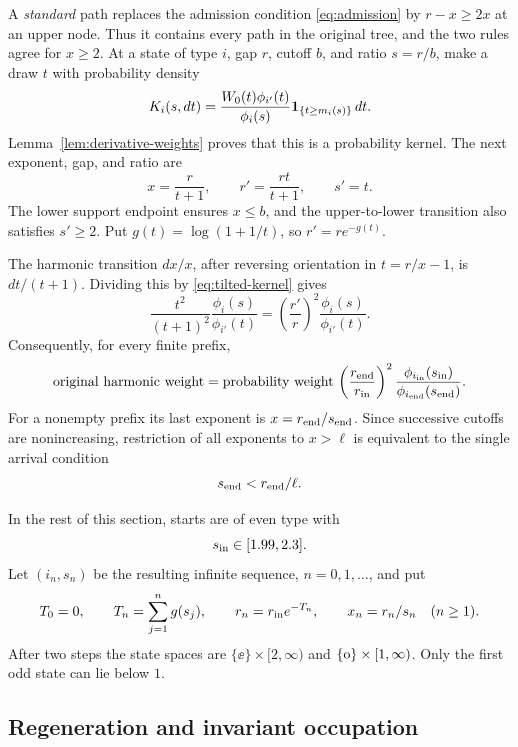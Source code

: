 A \emph{standard} path replaces the admission condition
\eqref{eq:admission} by \(r-x\ge2x\) at an upper node.
Thus it contains every path in the original tree, and the two rules
agree for \(x\ge2\).
At a state of type \(i\), gap \(r\), cutoff \(b\), and ratio \(s=r/b\),
make a draw \(t\) with probability density
\begin{equation}\label{eq:tilted-kernel}
 K_i(s,dt)=
 \frac{W_0(t)\phi_{i'}(t)}{\phi_i(s)}
 \mathbf 1_{\{t\ge m_i(s)\}}\,dt.
\end{equation}
Lemma~\ref{lem:derivative-weights} proves that this is a probability
kernel.  The next exponent, gap, and ratio are
\[
 x=\frac r{t+1},\qquad r'=\frac{rt}{t+1},\qquad s'=t.
\]
The lower support endpoint ensures \(x\le b\), and the upper-to-lower
transition also satisfies \(s'\ge2\).
Put \(g(t)=\log(1+1/t)\), so \(r'=r e^{-g(t)}\).

The harmonic transition \(dx/x\), after reversing orientation in
\(t=r/x-1\), is \(dt/(t+1)\).  Dividing this by
\eqref{eq:tilted-kernel} gives
\[
 \frac{t^2}{(t+1)^2}\frac{\phi_i(s)}{\phi_{i'}(t)}
 =\left(\frac{r'}r\right)^2
    \frac{\phi_i(s)}{\phi_{i'}(t)}.
\]
Consequently, for every finite prefix,
\begin{equation}\label{eq:path-weight}
 \text{original harmonic weight}
 =
 \text{probability weight}\,
 \left(\frac{r_{\rm end}}{r_{\rm in}}\right)^2
 \frac{\phi_{i_{\rm in}}(s_{\rm in})}
      {\phi_{i_{\rm end}}(s_{\rm end})}.
\end{equation}
For a nonempty prefix its last exponent is
\(x=r_{\rm end}/s_{\rm end}\).  Since successive cutoffs are
nonincreasing, restriction of all exponents to \(x>\ell\) is
equivalent to the single arrival condition
\begin{equation}\label{eq:functions-arrival-cutoff}
 s_{\rm end}<r_{\rm end}/\ell.
\end{equation}

In the rest of this section, starts are of even type with
\begin{equation}\label{eq:functions-start-range}
 s_{\rm in}\in[1.99,2.3].
\end{equation}
Let \((i_n,s_n)\) be the resulting infinite sequence, \(n=0,1,\ldots\),
and put
\[
 T_0=0,\qquad T_n=\sum_{j=1}^n g(s_j),\qquad
 r_n=r_{\rm in}e^{-T_n},\qquad x_n=r_n/s_n\quad(n\ge1).
\]
After two steps the state spaces are
\(\{\ee\}\times[2,\infty)\) and \(\{\mathrm o\}\times[1,\infty)\).
Only the first odd state can lie below \(1\).

\subsection{Regeneration and invariant occupation}

